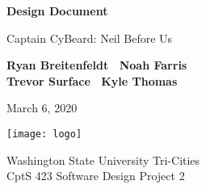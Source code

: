 \begin{titlepage}
    \begin{center}
        \vspace*{1cm}

        \Huge
        \textbf{Design Document}

        \vspace{.5cm}
        \LARGE
        Captain CyBeard: Neil Before Us

        \vspace{1cm}

        \textbf{Ryan Breitenfeldt \textbar\ Noah Farris\\ Trevor Surface \textbar\ Kyle Thomas}

        \vspace{.2cm}
        \Large
        March 6, 2020

        \vspace{2cm}
        \texttt{[image: logo]}

        \vfill

        Washington State University Tri-Cities\\
        CptS 423 Software Design Project 2

    \end{center}
\end{titlepage}

